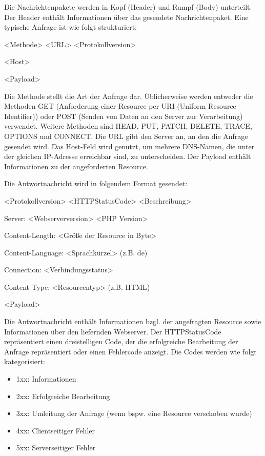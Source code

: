 Die Nachrichtenpakete werden in Kopf (Header) und Rumpf (Body) unterteilt. Der Header enthält Informationen über das gesendete Nachrichtenpaket. Eine typische Anfrage ist wie folgt strukturiert:

<Methode> <URL> <Protokollversion>

<Host>

<Payload>


Die Methode stellt die Art der Anfrage dar. Üblicherweise werden entweder die Methoden \glqq GET\grqq{}  (Anforderung einer Resource per URI (Uniform Resource Identifier)) oder \glqq POST\grqq{}  (Senden von Daten an den Server zur Verarbeitung) verwendet. Weitere Methoden sind HEAD, PUT, PATCH, DELETE, TRACE, OPTIONS und CONNECT.
Die URL gibt den Server an, an den die Anfrage gesendet wird. Das Host-Feld wird genutzt, um mehrere DNS-Namen, die unter der gleichen IP-Adresse erreichbar sind, zu unterscheiden. Der Payload enthält Informationen zu der angeforderten Resource.

Die Antwortnachricht wird in folgendem Format gesendet:

<Protokollversion> <HTTPStatusCode> <Beschreibung>

Server: <Webserverversion> <PHP Version>

Content-Length: <Größe der Resource in Byte>

Content-Language: <Sprachkürzel> (z.B. \glqq de\grqq )

Connection: <Verbindungsstatus>

Content-Type: <Resourcentyp> (z.B. HTML)

<Payload>


Die Antwortnachricht enthält Informationen bzgl. der angefragten Resource sowie Informationen über den liefernden Webserver. Der HTTPStatusCode repräsentiert einen dreistelligen Code, der die erfolgreiche Bearbeitung der Anfrage repräsentiert oder einen Fehlercode anzeigt. Die Codes werden wie folgt kategorisiert:
\begin{itemize}
\item 1xx: Informationen
\item 2xx: Erfolgreiche Bearbeitung
\item 3xx: Umleitung der Anfrage (wenn bspw. eine Resource verschoben wurde)
\item 4xx: Clientseitiger Fehler
\item 5xx:  Serverseitiger Fehler
\end{itemize}

